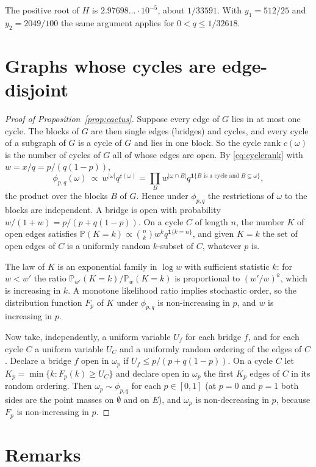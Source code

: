 \documentclass[11pt]{amsart}
\theoremstyle{remark}
\numberwithin{equation}{section}
\newcommand{\Pp}{\mathbb P}
\begin{document}
The positive root of $H$ is $2.97698\ldots\cdot10^{-5}$, about $1/33591$. With $y_1=512/25$ and $y_2=2049/100$ the same argument applies for $0<q\le1/32618$.

\section{Graphs whose cycles are edge-disjoint}\label{sec:cactus}

\begin{proof}[Proof of Proposition~\ref{prop:cactus}]
Suppose every edge of $G$ lies in at most one cycle. The blocks of $G$ are then single edges (bridges) and cycles, and every cycle of a subgraph of $G$ is a cycle of $G$ and lies in one block. So the cycle rank $c(\omega)$ is the number of cycles of $G$ all of whose edges are open. By \eqref{eq:cyclerank} with $w=x/q=p/(q(1-p))$,
\[
 \phi_{p,q}(\omega)\ \propto\ w^{|\omega|}q^{c(\omega)}=\prod_{B}w^{|\omega\cap B|}q^{\mathbf 1\{B\text{ is a cycle and }B\subseteq\omega\}},
\]
the product over the blocks $B$ of $G$. Hence under $\phi_{p,q}$ the restrictions of $\omega$ to the blocks are independent. A bridge is open with probability $w/(1+w)=p/(p+q(1-p))$. On a cycle $C$ of length $n$, the number $K$ of open edges satisfies $\Pp(K=k)\propto\binom nk w^kq^{\mathbf 1\{k=n\}}$, and given $K=k$ the set of open edges of $C$ is a uniformly random $k$-subset of $C$, whatever $p$ is.

The law of $K$ is an exponential family in $\log w$ with sufficient statistic $k$: for $w<w'$ the ratio $\Pp_{w'}(K=k)/\Pp_w(K=k)$ is proportional to $(w'/w)^k$, which is increasing in $k$. A monotone likelihood ratio implies stochastic order, so the distribution function $F_p$ of $K$ under $\phi_{p,q}$ is non-increasing in $p$, and $w$ is increasing in $p$.

Now take, independently, a uniform variable $U_f$ for each bridge $f$, and for each cycle $C$ a uniform variable $U_C$ and a uniformly random ordering of the edges of $C$. Declare a bridge $f$ open in $\omega_p$ if $U_f\le p/(p+q(1-p))$. On a cycle $C$ let $K_p=\min\{k:F_p(k)\ge U_C\}$ and declare open in $\omega_p$ the first $K_p$ edges of $C$ in its random ordering. Then $\omega_p\sim\phi_{p,q}$ for each $p\in[0,1]$ (at $p=0$ and $p=1$ both sides are the point masses on $\emptyset$ and on $E$), and $\omega_p$ is non-decreasing in $p$, because $F_p$ is non-increasing in $p$.
\end{proof}

\section{Remarks}\label{sec:remarks}
\end{document}
